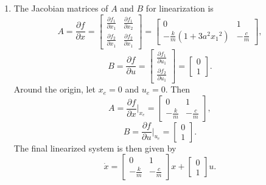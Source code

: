 \documentclass{article}
\begin{document}
\begin{enumerate}
    \item
    The Jacobian matrices of $A$ and $B$ for linearization is
    $$ A = \frac{\partial{f}}{\partial{x}} = 
    \left[
    \begin{matrix}
    \frac{\partial{f_1}}{\partial{x_1}} & \frac{\partial{f_1}}{\partial{x_2}} \\
    \frac{\partial{f_2}}{\partial{x_1}} & \frac{\partial{f_2}}{\partial{x_1}}
    \end{matrix}
    \right]
    = 
    \left[
    \begin{matrix}
    0 & 1 \\
    -\frac{k}{m}(1+3a^{2}{x_1}^{2}) & -\frac{c}{m}
    \end{matrix}
    \right]
    ,$$
    $$
    B = \frac{\partial{f}}{\partial{u}} = 
    \left[
    \begin{matrix}
    \frac{\partial f_1}{\partial u_1} \\
    \frac{\partial f_2}{\partial u_1}
    \end{matrix}
    \right]
    =
    \left[
    \begin{matrix}
    0 \\
    1
    \end{matrix}
    \right].
    $$
    Around the origin, let $x_e=0$ and $u_e=0$. Then
    $$ A = \frac{\partial{f}}{\partial{x}}\Bigr|_{x_e}
    = 
    \left[
    \begin{matrix}
    0 & 1 \\
    -\frac{k}{m} & -\frac{c}{m}
    \end{matrix}
    \right], $$
    $$ B = \frac{\partial{f}}{\partial{u}}\Bigr|_{u_e}
     = 
    \left[
    \begin{matrix}
    0 \\
    1
    \end{matrix}
    \right]. $$
    The final linearized system is then given by
    $$ \dot{x} = 
    \left[
    \begin{matrix}
    0 & 1 \\
    -\frac{k}{m} & -\frac{c}{m}
    \end{matrix}
    \right] 
    x + 
    \left[
    \begin{matrix}
    0 \\
    1
    \end{matrix}
    \right] 
    u. $$
    

\end{enumerate}
\end{document}
